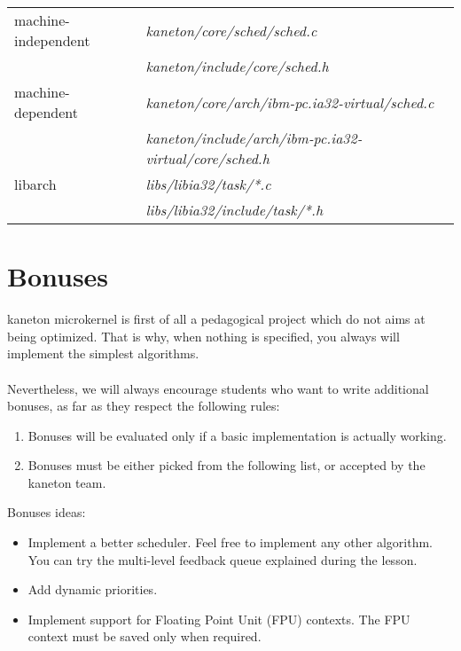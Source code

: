 \begin{tabular}{| l | l |}
  \hline
  machine-independent & {\em kaneton/core/sched/sched.c}\\
  &  {\em kaneton/include/core/sched.h}\\\hline
  machine-dependent & {\em kaneton/core/arch/ibm-pc.ia32-virtual/sched.c}\\
  & {\em kaneton/include/arch/ibm-pc.ia32-virtual/core/sched.h}\\\hline
  libarch & {\em libs/libia32/task/*.c}\\
  &  {\em libs/libia32/include/task/*.h}\\\hline
\end{tabular}

%
%

\newpage

\section{Bonuses}

kaneton microkernel is first of all a pedagogical project which do not
aims at being optimized. That is why, when nothing is specified, you
always will implement the simplest algorithms.\\
\\
Nevertheless, we will always encourage students who want to write
additional bonuses, as far as they respect the following rules:

\begin{enumerate}
  \item Bonuses will be evaluated only if a basic implementation is
  actually working.
  \item Bonuses must be either picked from the following list, or
  accepted by the kaneton team.\\
\end{enumerate}

Bonuses ideas:
\begin{itemize}
\item
  Implement a better scheduler. Feel free to implement any other
  algorithm. You can try the multi-level feedback queue explained
  during the lesson.

\item
  Add dynamic priorities.

\item
  Implement support for Floating Point Unit (FPU) contexts. The FPU
  context must be saved only when required.
\end{itemize}

